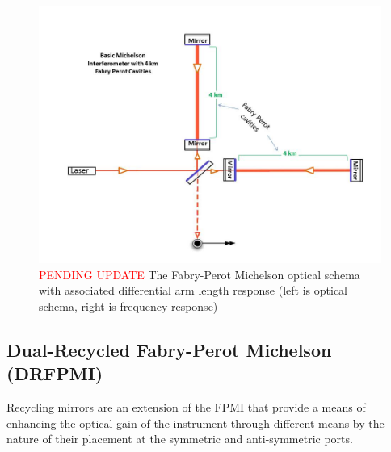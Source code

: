 \begin{figure}[H]
\begin{center}
\includegraphics[width=\textwidth]{figs/INTRO/tempsub_Basic_michelson_with_FP_labeled.jpg}
\end{center}
\caption{\textcolor{red}{PENDING UPDATE} The Fabry-Perot Michelson optical schema with associated differential arm length response (left is optical schema, right is frequency response)}
\label{fig:fp_michelson}
\end{figure}

\subsection{Dual-Recycled Fabry-Perot Michelson (DRFPMI)}
Recycling mirrors are an extension of the FPMI that provide a means of enhancing the optical gain of the instrument through different means by the nature of their placement at the symmetric and anti-symmetric ports.

